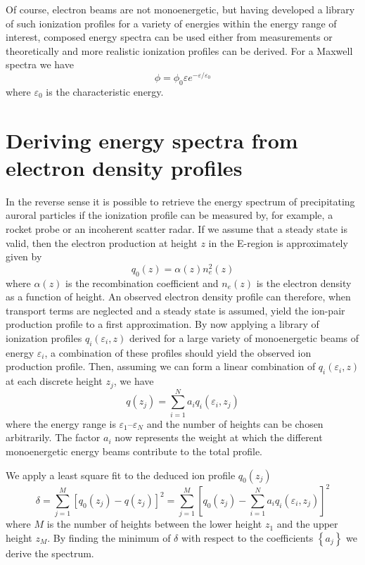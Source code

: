 Of course, electron beams are not monoenergetic, but having developed a library of such ionization profiles for a variety of energies within the energy range of interest, composed energy spectra can be used either from measurements or theoretically and more realistic ionization profiles can be derived. For a Maxwell spectra we have
\begin{equation*}
    \phi=\phi_0\varepsilon e^{-\varepsilon/\varepsilon_0}
\end{equation*}
where \(\varepsilon_0\) is the characteristic energy.

\section{Deriving energy spectra from electron density profiles}
In the reverse sense it is possible to retrieve the energy spectrum of precipitating auroral particles if the ionization profile can be measured by, for example, a rocket probe or an incoherent scatter radar. If we assume that a steady state is valid, then the electron production at height \(z\) in the E-region is approximately given by
\begin{equation*}
    q_0(z)=\alpha(z)n_e^2(z)
\end{equation*}
where \(\alpha(z)\) is the recombination coefficient and \(n_e(z)\) is the electron density as a function of height. An observed electron density profile can therefore, when transport terms are neglected and a steady state is assumed, yield the ion-pair production profile to a first approximation. By now applying a library of ionization profiles \(q_i(\varepsilon_i,z)\) derived for a large variety of monoenergetic beams of energy \(\varepsilon_i\), a combination of these profiles should yield the observed ion production profile. Then, assuming we can form a linear combination of \(q_i(\varepsilon_i,z)\) at each discrete height \(z_j\), we have
\begin{equation*}
    q(z_j)=\sum_{i=1}^{N}a_{i}q_i(\varepsilon_i,z_j)
\end{equation*}
where the energy range is \(\varepsilon_1\)--\(\varepsilon_N\) and the number of heights can be chosen arbitrarily. The factor \(a_i\) now represents the weight at which the different monoenergetic energy beams contribute to the total profile.

We apply a least square fit to the deduced ion profile \(q_0(z_j)\)
\begin{equation*}
    \delta=\sum_{j=1}^M{\left[q_0(z_j)-q(z_j)\right]}^2=\sum_{j=1}^M{\left[q_0(z_j)-\sum_{i=1}^{N}a_{i}q_i(\varepsilon_i,z_j)\right]}^2
\end{equation*}
where \(M\) is the number of heights between the lower height \(z_1\) and the upper height \(z_M\). By finding the minimum of \(\delta \) with respect to the coefficients \(\left \{a_j\right \} \) we derive the spectrum.

